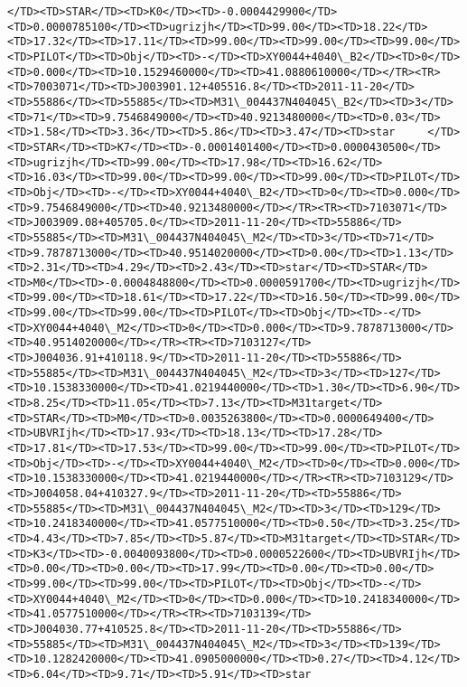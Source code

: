 \documentclass[11pt]{article}
\begin{document}
\begin{Verbatim}[commandchars=\\\{\}]
</TD><TD>STAR</TD><TD>K0</TD><TD>-0.0004429900</TD><TD>0.0000785100</TD><TD>ugrizjh</TD><TD>99.00</TD><TD>18.22</TD><TD>17.32</TD><TD>17.11</TD><TD>99.00</TD><TD>99.00</TD><TD>99.00</TD><TD>PILOT</TD><TD>Obj</TD><TD>-</TD><TD>XY0044+4040\_B2</TD><TD>0</TD><TD>0.000</TD><TD>10.1529460000</TD><TD>41.0880610000</TD></TR><TR><TD>7003071</TD><TD>J003901.12+405516.8</TD><TD>2011-11-20</TD><TD>55886</TD><TD>55885</TD><TD>M31\_004437N404045\_B2</TD><TD>3</TD><TD>71</TD><TD>9.7546849000</TD><TD>40.9213480000</TD><TD>0.03</TD><TD>1.58</TD><TD>3.36</TD><TD>5.86</TD><TD>3.47</TD><TD>star     </TD><TD>STAR</TD><TD>K7</TD><TD>-0.0001401400</TD><TD>0.0000430500</TD><TD>ugrizjh</TD><TD>99.00</TD><TD>17.98</TD><TD>16.62</TD><TD>16.03</TD><TD>99.00</TD><TD>99.00</TD><TD>99.00</TD><TD>PILOT</TD><TD>Obj</TD><TD>-</TD><TD>XY0044+4040\_B2</TD><TD>0</TD><TD>0.000</TD><TD>9.7546849000</TD><TD>40.9213480000</TD></TR><TR><TD>7103071</TD><TD>J003909.08+405705.0</TD><TD>2011-11-20</TD><TD>55886</TD><TD>55885</TD><TD>M31\_004437N404045\_M2</TD><TD>3</TD><TD>71</TD><TD>9.7878713000</TD><TD>40.9514020000</TD><TD>0.00</TD><TD>1.13</TD><TD>2.31</TD><TD>4.29</TD><TD>2.43</TD><TD>star</TD><TD>STAR</TD><TD>M0</TD><TD>-0.0004848800</TD><TD>0.0000591700</TD><TD>ugrizjh</TD><TD>99.00</TD><TD>18.61</TD><TD>17.22</TD><TD>16.50</TD><TD>99.00</TD><TD>99.00</TD><TD>99.00</TD><TD>PILOT</TD><TD>Obj</TD><TD>-</TD><TD>XY0044+4040\_M2</TD><TD>0</TD><TD>0.000</TD><TD>9.7878713000</TD><TD>40.9514020000</TD></TR><TR><TD>7103127</TD><TD>J004036.91+410118.9</TD><TD>2011-11-20</TD><TD>55886</TD><TD>55885</TD><TD>M31\_004437N404045\_M2</TD><TD>3</TD><TD>127</TD><TD>10.1538330000</TD><TD>41.0219440000</TD><TD>1.30</TD><TD>6.90</TD><TD>8.25</TD><TD>11.05</TD><TD>7.13</TD><TD>M31target</TD><TD>STAR</TD><TD>M0</TD><TD>0.0035263800</TD><TD>0.0000649400</TD><TD>UBVRIjh</TD><TD>17.93</TD><TD>18.13</TD><TD>17.28</TD><TD>17.81</TD><TD>17.53</TD><TD>99.00</TD><TD>99.00</TD><TD>PILOT</TD><TD>Obj</TD><TD>-</TD><TD>XY0044+4040\_M2</TD><TD>0</TD><TD>0.000</TD><TD>10.1538330000</TD><TD>41.0219440000</TD></TR><TR><TD>7103129</TD><TD>J004058.04+410327.9</TD><TD>2011-11-20</TD><TD>55886</TD><TD>55885</TD><TD>M31\_004437N404045\_M2</TD><TD>3</TD><TD>129</TD><TD>10.2418340000</TD><TD>41.0577510000</TD><TD>0.50</TD><TD>3.25</TD><TD>4.43</TD><TD>7.85</TD><TD>5.87</TD><TD>M31target</TD><TD>STAR</TD><TD>K3</TD><TD>-0.0040093800</TD><TD>0.0000522600</TD><TD>UBVRIjh</TD><TD>0.00</TD><TD>0.00</TD><TD>17.99</TD><TD>0.00</TD><TD>0.00</TD><TD>99.00</TD><TD>99.00</TD><TD>PILOT</TD><TD>Obj</TD><TD>-</TD><TD>XY0044+4040\_M2</TD><TD>0</TD><TD>0.000</TD><TD>10.2418340000</TD><TD>41.0577510000</TD></TR><TR><TD>7103139</TD><TD>J004030.77+410525.8</TD><TD>2011-11-20</TD><TD>55886</TD><TD>55885</TD><TD>M31\_004437N404045\_M2</TD><TD>3</TD><TD>139</TD><TD>10.1282420000</TD><TD>41.0905000000</TD><TD>0.27</TD><TD>4.12</TD><TD>6.04</TD><TD>9.71</TD><TD>5.91</TD><TD>star     
\end{Verbatim}
\end{document}
